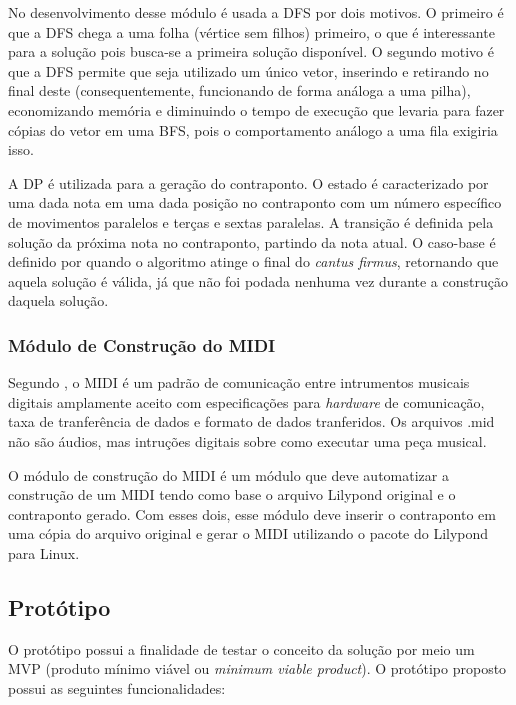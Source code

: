       No desenvolvimento desse módulo é usada a DFS por dois motivos. O primeiro é que a DFS chega a uma folha (vértice sem filhos) primeiro, o que é interessante para a solução pois busca-se a primeira solução disponível. O segundo motivo é que a DFS permite que seja utilizado um único vetor, inserindo e retirando no final deste (consequentemente, funcionando de forma análoga a uma pilha), economizando memória e diminuindo o tempo de execução que levaria para fazer cópias do vetor em uma BFS, pois o comportamento análogo a uma fila exigiria isso.

      A DP é utilizada para a geração do contraponto. O estado é caracterizado por uma dada nota em uma dada posição no contraponto com um número específico de movimentos paralelos e terças e sextas paralelas. A transição é definida pela solução da próxima nota no contraponto, partindo da nota atual. O caso-base é definido por quando o algoritmo atinge o final do \textit{cantus firmus}, retornando que aquela solução é válida, já que não foi podada nenhuma vez durante a construção daquela solução.

    \subsubsection[Módulo de Construção do MIDI]{Módulo de Construção do MIDI}

      Segundo \cite{midi}, o MIDI é um padrão de comunicação entre intrumentos musicais digitais amplamente aceito  com especificações para \textit{hardware} de comunicação, taxa de tranferência de dados e formato de dados tranferidos. Os arquivos .mid não são áudios, mas intruções digitais sobre como executar uma peça musical.

      O módulo de construção do MIDI é um módulo que deve automatizar a construção de um MIDI tendo como base o arquivo Lilypond original e o contraponto gerado. Com esses dois, esse módulo deve inserir o contraponto em uma cópia do arquivo original e gerar o MIDI utilizando o pacote do Lilypond para Linux.

  \subsection[Protótipo]{Protótipo}

    O protótipo possui a finalidade de testar o conceito da solução por meio um MVP (produto mínimo viável ou \textit{minimum viable product}). O protótipo proposto possui as seguintes funcionalidades:

